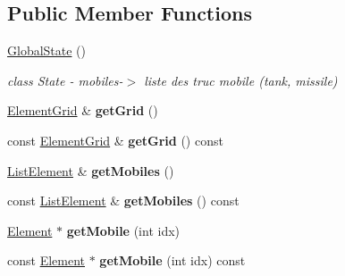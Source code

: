 \subsection*{Public Member Functions}
\begin{DoxyCompactItemize}
\item 
\mbox{\label{classstate_1_1_global_state_aafb29e5a90ae4f8e27d25ed3c186dd80}} 
\hyperlink{classstate_1_1_global_state_aafb29e5a90ae4f8e27d25ed3c186dd80}{Global\+State} ()
\begin{DoxyCompactList}\small\item\em class State -\/ mobiles-\/$>$ liste des truc mobile (tank, missile) \end{DoxyCompactList}\item 
\mbox{\label{classstate_1_1_global_state_a9d868ea2e34692ccbc1fd648bbbc7eea}} 
\hyperlink{classstate_1_1_element_grid}{Element\+Grid} \& {\bfseries get\+Grid} ()
\item 
\mbox{\label{classstate_1_1_global_state_a41e3ba4093579173405af0ca54c0f06d}} 
const \hyperlink{classstate_1_1_element_grid}{Element\+Grid} \& {\bfseries get\+Grid} () const
\item 
\mbox{\label{classstate_1_1_global_state_abe00dc79287ea41a01127ae580b720f4}} 
\hyperlink{classstate_1_1_list_element}{List\+Element} \& {\bfseries get\+Mobiles} ()
\item 
\mbox{\label{classstate_1_1_global_state_a77b88d9885aba43976ec8eab9ef7db64}} 
const \hyperlink{classstate_1_1_list_element}{List\+Element} \& {\bfseries get\+Mobiles} () const
\item 
\mbox{\label{classstate_1_1_global_state_a2f2626fa22999e1d45d2fb82f5142f9f}} 
\hyperlink{classstate_1_1_element}{Element} $\ast$ {\bfseries get\+Mobile} (int idx)
\item 
\mbox{\label{classstate_1_1_global_state_ac6fc2db0c360c6014fb161062b882679}} 
const \hyperlink{classstate_1_1_element}{Element} $\ast$ {\bfseries get\+Mobile} (int idx) const
\item 
\mbox{\label{classstate_1_1_global_state_aec97fdccde7f2733b799b328375bdf81}} 

\end{DoxyCompactItemize}

